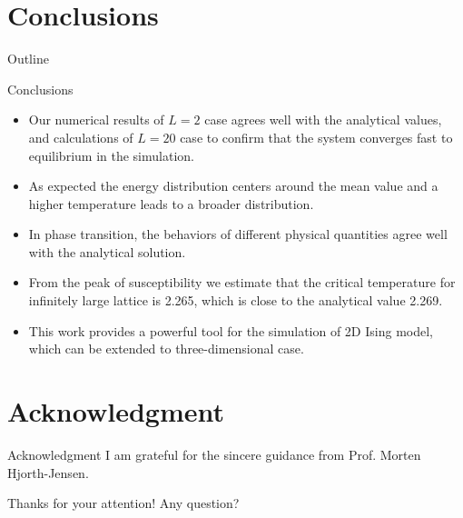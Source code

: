 \documentclass{beamer}
\begin{document}
\section{Conclusions}
\begin{frame}{Outline}
\tableofcontents[currentsection]
\end{frame}

\begin{frame}{Conclusions}
\begin{itemize}
	\item<1-> Our numerical results of $L=2$ case agrees well with the analytical values, 
	and calculations of $L=20$ case to confirm that the system converges fast to equilibrium in the simulation. 
	\item<2-> As expected the energy distribution centers around the mean value and a higher temperature leads to a broader distribution. 
	\item<3-> In phase transition, the behaviors of different physical quantities agree well with the analytical solution. 
	\item<4-> From the peak of susceptibility we estimate that the critical temperature for infinitely large lattice is 2.265, 
	which is close to the analytical value 2.269. 
	\item<5-> This work provides a powerful tool for the simulation of 2D Ising model, which can be extended to three-dimensional case. 
\end{itemize}
\end{frame}

\section*{Acknowledgment}
\begin{frame}{Acknowledgment}
	I am grateful for the sincere guidance from Prof. Morten Hjorth-Jensen. 
	\par
	Thanks for your attention! Any question? 
\end{frame}
\end{document}
